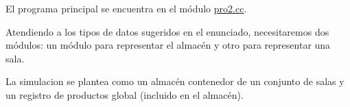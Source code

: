 El programa principal se encuentra en el módulo \hyperlink{pro2_8cc}{pro2.\+cc}.

Atendiendo a los tipos de datos sugeridos en el enunciado, necesitaremos dos módulos\+: un módulo para representar el almacén y otro para representar una sala.

La simulacion se plantea como un almacén contenedor de un conjunto de salas y un registro de productos global (incluido en el almacén). 